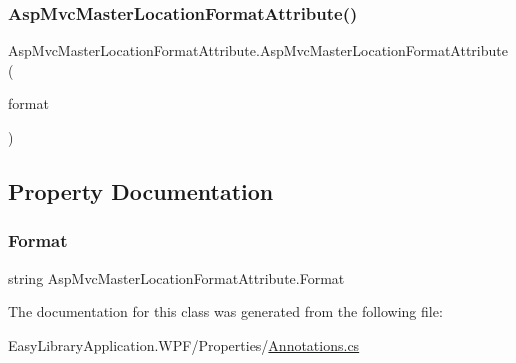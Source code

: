 \subsubsection{\texorpdfstring{Asp\+Mvc\+Master\+Location\+Format\+Attribute()}{AspMvcMasterLocationFormatAttribute()}}
{\footnotesize\ttfamily Asp\+Mvc\+Master\+Location\+Format\+Attribute.\+Asp\+Mvc\+Master\+Location\+Format\+Attribute (\begin{DoxyParamCaption}\item[{\mbox{[}\+Not\+Null\mbox{]} string}]{format }\end{DoxyParamCaption})}



\subsection{Property Documentation}
\mbox{\label{class_asp_mvc_master_location_format_attribute_a12e48477c571f14556915ebdef251912}} 
\subsubsection{\texorpdfstring{Format}{Format}}
{\footnotesize\ttfamily string Asp\+Mvc\+Master\+Location\+Format\+Attribute.\+Format\hspace{0.3cm}{\ttfamily [get]}}



The documentation for this class was generated from the following file\+:\begin{DoxyCompactItemize}
\item 
Easy\+Library\+Application.\+W\+P\+F/\+Properties/\mbox{\hyperlink{_annotations_8cs}{Annotations.\+cs}}\end{DoxyCompactItemize}
